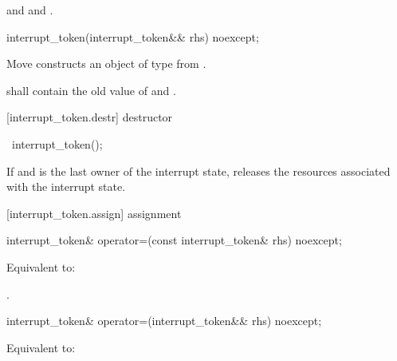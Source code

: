 {\begin{itemdescr}
  \pnum\postconditions {}
                and 
                and .
\end{itemdescr}

%
\begin{itemdecl}
interrupt_token(interrupt_token&& rhs) noexcept;
\end{itemdecl}
\begin{itemdescr}
  \pnum\effects Move constructs an object of type  from .

  \pnum\postconditions {} shall contain the old value of  and
                        .
\end{itemdescr}

[interrupt_token.destr]{ destructor}

%
\begin{itemdecl}
~interrupt_token();
\end{itemdecl}

\begin{itemdescr}
 \pnum\effects If  and  is the last owner of the interrupt state,
                releases the resources associated with the interrupt state.
\end{itemdescr}

[interrupt_token.assign]{ assignment}

%
\begin{itemdecl}
interrupt_token& operator=(const interrupt_token& rhs) noexcept;
\end{itemdecl}
\begin{itemdescr}
  \pnum\effects Equivalent to: 

  \pnum\returns {}.
\end{itemdescr}

%
\begin{itemdecl}
interrupt_token& operator=(interrupt_token&& rhs) noexcept;
\end{itemdecl}
\begin{itemdescr}
  \pnum\effects Equivalent to: 


\end{itemdescr}}

